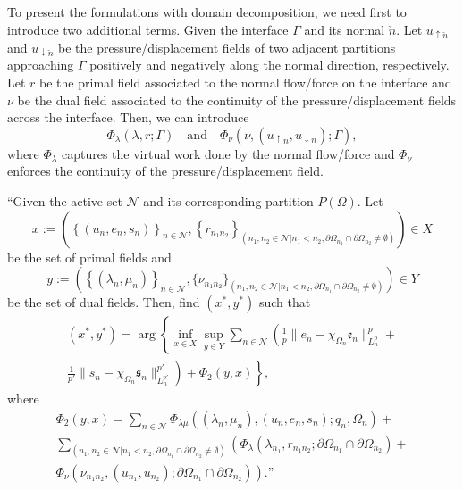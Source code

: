 To present the formulations with domain decomposition, we need first to introduce two additional terms. Given the interface $\Gamma$ and its normal $\check{n}$. Let  $u_{\uparrow\check{n}}$ and $u_{\downarrow\check{n}}$ be the pressure/displacement fields of two adjacent partitions approaching $\Gamma$ positively and negatively along the normal direction, respectively. Let $r$ be the primal field associated to the normal flow/force on the interface and $\nu$ be the dual field associated to the continuity of the pressure/displacement fields across the interface. Then, we can introduce
%
\begin{equation}
    \Phi_{\lambda}(\lambda, r;\Gamma) \quad\textrm{and}\quad \Phi_{\nu}(\nu, (u_{\uparrow\check{n}}, u_{\downarrow\check{n}});\Gamma),
\end{equation}
%
where $\Phi_\lambda$ captures the virtual work done by the normal flow/force and $\Phi_\nu$ enforces the continuity of the pressure/displacement field.

\begin{problem}[NLSP2]
\hspace{-2mm}``Given the active set $\mathcal{N}$ and its corresponding partition $P(\Omega)$. Let 
\begin{equation}
x := 
\left(
\left\lbrace (u_n,e_n,s_n) \right\rbrace_{n\in\mathcal{N}},
\left\lbrace r_{n_1 n_2} \right\rbrace_{\left(n_1, n_2 \in \mathcal{N}| n_1 < n_2, \partial \Omega_{n_1} \cap \partial \Omega_{n_2} \neq \emptyset\right)}
\right) \in X
\end{equation}
be the set of primal fields and
\begin{equation}
y :=
\left(
\left\lbrace (\lambda_n,\mu_n) \right\rbrace_{n \in \mathcal{N}},
\{\nu_{n_1 n_2}\}_{\left( n_1, n_2 \in \mathcal{N}| n_1 < n_2, \partial \Omega_{n_1} \cap \partial \Omega_{n_2} \neq \emptyset \right)}
\right) \in Y
\end{equation}
be the set of dual fields. Then, find $(x^*, y^*)$ such that
\begin{multline}
(x^*, y^*) =
\arg
\left\{
\inf_{x \in X}
\sup_{y \in Y}
\sum_{n \in \mathcal{N}}
\left(
\frac{1}{p}\|e_n-\chi_{\Omega_n}\mathfrak{e}_n\|^{p}_{L^p_n}+
\right.
\right.
\\
\left.
\left.
\frac{1}{p'}\|s_n-\chi_{\Omega_n}\mathfrak{s}_n\|^{p'}_{L^{p'}_n}
\right)+
\Phi_2(y,x)
\right\},
\end{multline}
where
\begin{multline}
\Phi_2(y,x) =   
\sum_{n \in \mathcal{N}}
\Phi_{\lambda\mu}((\lambda_n,\mu_n),(u_n,e_n,s_n);q_n,\Omega_n)
+\\
\sum_{\left(n_1, n_2 \in \mathcal{N}| n_1 < n_2, \partial \Omega_{n_1} \cap \partial \Omega_{n_2} \neq \emptyset\right)} 
\left(
\Phi_{\lambda}(\lambda_{n_1}, r_{n_1 n_2};\partial \Omega_{n_1} \cap \partial \Omega_{n_2})+
\right.
\\
\left.
\Phi_{\nu}(\nu_{n_1 n_2},( u_{n_1}, u_{n_2});\partial \Omega_{n_1} \cap \partial \Omega_{n_2})
\right).\textrm{''}
\end{multline}
\end{problem}

